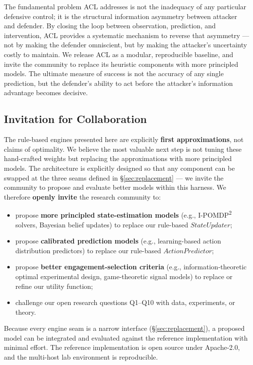 \documentclass[11pt]{article}
\begin{document}
The fundamental problem ACL addresses is not the inadequacy of any particular defensive control; it is the structural information asymmetry between attacker and defender. By closing the loop between observation, prediction, and intervention, ACL provides a systematic mechanism to reverse that asymmetry --- not by making the defender omniscient, but by making the attacker's uncertainty costly to maintain. We release ACL as a modular, reproducible baseline, and invite the community to replace its heuristic components with more principled models. The ultimate measure of success is not the accuracy of any single prediction, but the defender's ability to act before the attacker's information advantage becomes decisive.

\subsection{Invitation for Collaboration}

The rule-based engines presented here are explicitly \textbf{first
approximations}, not claims of optimality. We believe the most valuable next
step is not tuning these hand-crafted weights but replacing the approximations
with more principled models. The architecture is explicitly designed so that
any component can be swapped at the three seams defined in
\S\ref{sec:replacement} --- we invite the community to propose and evaluate
better models within this harness. We therefore \textbf{openly invite} the
research community to:
\begin{itemize}
\item propose \textbf{more principled state-estimation models} (e.g.,
      I-POMDP\textsuperscript{2} solvers, Bayesian belief updates) to
      replace our rule-based $\mathit{StateUpdater}$;
\item propose \textbf{calibrated prediction models} (e.g., learning-based
      action distribution predictors) to replace our rule-based
      $\mathit{ActionPredictor}$;
\item propose \textbf{better engagement-selection criteria} (e.g.,
      information-theoretic optimal experimental design, game-theoretic
      signal models) to replace or refine our utility function;
\item challenge our open research questions Q1--Q10 with data, experiments,
      or theory.
\end{itemize}
Because every engine seam is a narrow interface
(\S\ref{sec:replacement}), a proposed model can be integrated and evaluated
against the reference implementation with minimal effort. The reference
implementation is open source under Apache-2.0, and the multi-host lab
environment is reproducible.
\end{document}
